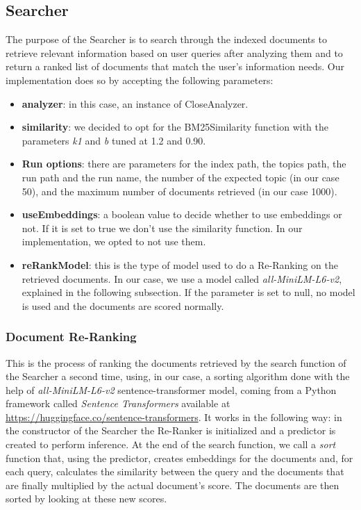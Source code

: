 \subsection{Searcher}
The purpose of the Searcher is to search through the indexed documents to retrieve relevant information based on user queries after analyzing them and to
return a ranked list of documents that match the user’s information needs.
\newline
Our implementation does so by accepting the following parameters:
\begin{itemize}
  \item \textbf{analyzer}: in this case, an instance of CloseAnalyzer.
  \item \textbf{similarity}: we decided to opt for the BM25Similarity function with the parameters \textit{k1} and \textit{b} tuned at 1.2 and 0.90.
  \item \textbf{Run options}: there are parameters for the index path, the topics path, the run path and the run name, the number of the expected topic (in our case 50), and the maximum number of documents retrieved (in our case 1000).
  \item \textbf{useEmbeddings}: a boolean value to decide whether to use embeddings or not. If it is set to true we don't use the similarity function. In our implementation, we opted to not use them.
  \item \textbf{reRankModel}: this is the type of model used to do a Re-Ranking on the retrieved documents. In our case, we use a model called \textit{all-MiniLM-L6-v2}, explained in the following subsection. If the parameter is set to null, no model is used and the documents are scored normally.
\end{itemize}

\subsubsection{Document Re-Ranking}
This is the process of ranking the documents retrieved by the search function of the Searcher a second time, using, in our case, a sorting algorithm done with the help of \textit{all-MiniLM-L6-v2} sentence-transformer model, coming from a Python framework called \textit{Sentence Transformers} available at \url{https://huggingface.co/sentence-transformers}.
\newline
It works in the following way: in the constructor of the Searcher the Re-Ranker is initialized and a predictor is created to perform inference. At the end of the search function, we call a \textit{sort} function that, using the predictor, creates embeddings for the documents and, for each query, calculates the similarity between the query and the documents that are finally multiplied by the actual document's score. The documents are then sorted by looking at these new scores.


